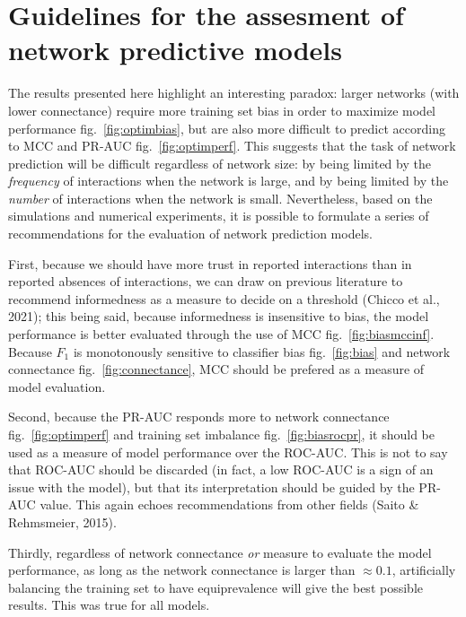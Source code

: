 \documentclass[10pt,oneside]{article}
\begin{document}
\hypertarget{guidelines-for-the-assesment-of-network-predictive-models}{%
\section{Guidelines for the assesment of network predictive
models}\label{guidelines-for-the-assesment-of-network-predictive-models}}

The results presented here highlight an interesting paradox: larger
networks (with lower connectance) require more training set bias in
order to maximize model performance fig.~\ref{fig:optimbias}, but are
also more difficult to predict according to MCC and PR-AUC
fig.~\ref{fig:optimperf}. This suggests that the task of network
prediction will be difficult regardless of network size: by being
limited by the \emph{frequency} of interactions when the network is
large, and by being limited by the \emph{number} of interactions when
the network is small. Nevertheless, based on the simulations and
numerical experiments, it is possible to formulate a series of
recommendations for the evaluation of network prediction models.

First, because we should have more trust in reported interactions than
in reported absences of interactions, we can draw on previous literature
to recommend informedness as a measure to decide on a threshold (Chicco
et al., 2021); this being said, because informedness is insensitive to
bias, the model performance is better evaluated through the use of MCC
fig.~\ref{fig:biasmccinf}. Because \(F_1\) is monotonously sensitive to
classifier bias fig.~\ref{fig:bias} and network connectance
fig.~\ref{fig:connectance}, MCC should be prefered as a measure of model
evaluation.

Second, because the PR-AUC responds more to network connectance
fig.~\ref{fig:optimperf} and training set imbalance
fig.~\ref{fig:biasrocpr}, it should be used as a measure of model
performance over the ROC-AUC. This is not to say that ROC-AUC should be
discarded (in fact, a low ROC-AUC is a sign of an issue with the model),
but that its interpretation should be guided by the PR-AUC value. This
again echoes recommendations from other fields (Saito \& Rehmsmeier,
2015).

Thirdly, regardless of network connectance \emph{or} measure to evaluate
the model performance, as long as the network connectance is larger than
\(\approx 0.1\), artificially balancing the training set to have
equiprevalence will give the best possible results. This was true for
all models.
\end{document}
